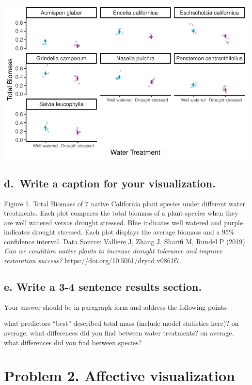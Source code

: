 \documentclass[
  letterpaper,
  DIV=11,
  numbers=noendperiod]{scrartcl}
\begin{document}
\includegraphics{ENVS193DS_Homework3_files/figure-pdf/unnamed-chunk-4-1.pdf}

\subsection{d.~Write a caption for your
visualization.}\label{d.-write-a-caption-for-your-visualization.}

Figure 1. Total Biomass of 7 native California plant species under
different water treatments. Each plot compares the total biomass of a
plant species when they are well watered versus drought stressed. Blue
indicates well watered and purple indicates drought stressed. Each plot
displays the average biomass and a 95\% confidence interval. Data
Source: Valliere J, Zhang J, Sharifi M, Rundel P (2019) \emph{Can we
condition native plants to increase drought tolerance and improve
restoration success?} https://doi.org/10.5061/dryad.v0861f7.

\subsection{e. Write a 3-4 sentence results
section.}\label{e.-write-a-3-4-sentence-results-section.}

Your answer should be in paragraph form and address the following
points:

what predictors ``best'' described total mass (include model statistics
here)? on average, what differences did you find between water
treatments? on average, what differences did you find between species?

\section{Problem 2. Affective
visualization}\label{problem-2.-affective-visualization}
\end{document}

